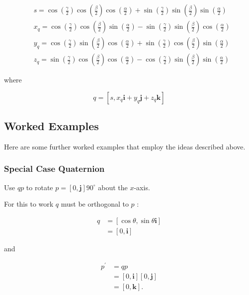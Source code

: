 \documentclass[10pt]{article}
\begin{document}
$$
\begin{aligned}
& s=\cos \left(\frac{\gamma}{2}\right) \cos \left(\frac{\beta}{2}\right) \cos \left(\frac{\alpha}{2}\right)+\sin \left(\frac{\gamma}{2}\right) \sin \left(\frac{\beta}{2}\right) \sin \left(\frac{\alpha}{2}\right) \\
& x_{q}=\cos \left(\frac{\gamma}{2}\right) \cos \left(\frac{\beta}{2}\right) \sin \left(\frac{\alpha}{2}\right)-\sin \left(\frac{\gamma}{2}\right) \sin \left(\frac{\beta}{2}\right) \cos \left(\frac{\alpha}{2}\right) \\
& y_{q}=\cos \left(\frac{\gamma}{2}\right) \sin \left(\frac{\beta}{2}\right) \cos \left(\frac{\alpha}{2}\right)+\sin \left(\frac{\gamma}{2}\right) \cos \left(\frac{\beta}{2}\right) \sin \left(\frac{\alpha}{2}\right) \\
& z_{q}=\sin \left(\frac{\gamma}{2}\right) \cos \left(\frac{\beta}{2}\right) \cos \left(\frac{\alpha}{2}\right)-\cos \left(\frac{\gamma}{2}\right) \sin \left(\frac{\beta}{2}\right) \sin \left(\frac{\alpha}{2}\right)
\end{aligned}
$$

where

$$
q=\left[s, x_{q} \mathbf{i}+y_{q} \mathbf{j}+z_{q} \mathbf{k}\right]
$$

\subsection{Worked Examples}
Here are some further worked examples that employ the ideas described above.

\subsubsection{Special Case Quaternion}
Use $q p$ to rotate $p=[0, \mathbf{j}] 90^{\circ}$ about the $x$-axis.

For this to work $q$ must be orthogonal to $p$ :

$$
\begin{aligned}
q & =[\cos \theta, \sin \theta \mathbf{i}] \\
& =[0, \mathbf{i}]
\end{aligned}
$$

and

$$
\begin{aligned}
p^{\prime} & =q p \\
& =[0, \mathbf{i}][0, \mathbf{j}] \\
& =[0, \mathbf{k}] .
\end{aligned}
$$
\end{document}
